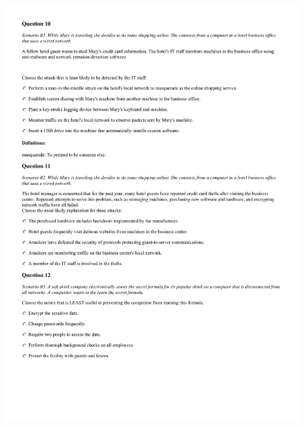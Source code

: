 \begin{figure}[!h]
    \begin{center}
    \advance\leftskip-3cm
    \advance\rightskip-3cm
    \includegraphics[scale=.25]{images/exam/correctly_formated_exam-05.jpg}
    \label{fig:correctly_formated_exam-05}
\end{center}
\end{figure}
